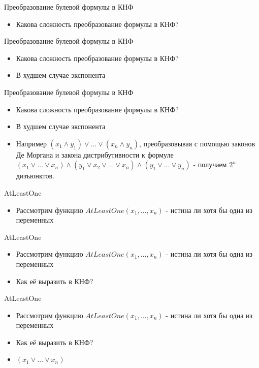 \documentclass{beamer}
\begin{document}
\begin{frame}{Преобразование булевой формулы в КНФ}
\begin{itemize}
\item Какова сложность преобразование формулы в КНФ?
\end{itemize}
\end{frame}

\begin{frame}{Преобразование булевой формулы в КНФ}
\begin{itemize}
\item Какова сложность преобразование формулы в КНФ?
\item В худшем случае экспонента
\end{itemize}
\end{frame}

\begin{frame}{Преобразование булевой формулы в КНФ}
\begin{itemize}
\item Какова сложность преобразование формулы в КНФ?
\item В худшем случае экспонента
\item Например $(x_1 \wedge y_1) \vee \dots \vee (x_n \wedge y_n)$, преобразовывая с помощью законов Де Моргана и закона
дистрибутивности к формуле $(x_1 \vee \dots \vee x_n) \wedge (y_1 \vee x_2 \vee \dots \vee x_n) \wedge (y_1 \vee \dots \vee y_n)$
- получаем $2^n$ дизъюнктов.
\end{itemize}
\end{frame}


\begin{frame}{AtLeastOne}
\begin{itemize}
\item Рассмотрим функцию $AtLeastOne(x_1, \dots, x_n)$ - истина ли хотя бы одна из переменных
\end{itemize}
\end{frame}

\begin{frame}{AtLeastOne}
\begin{itemize}
\item Рассмотрим функцию $AtLeastOne(x_1, \dots, x_n)$ - истина ли хотя бы одна из переменных
\item Как её выразить в КНФ?
\end{itemize}
\end{frame}

\begin{frame}{AtLeastOne}
\begin{itemize}
\item Рассмотрим функцию $AtLeastOne(x_1, \dots, x_n)$ - истина ли хотя бы одна из переменных
\item Как её выразить в КНФ?
\item $(x_1 \vee \dots \vee x_n)$
\end{itemize}
\end{frame}
\end{document}
